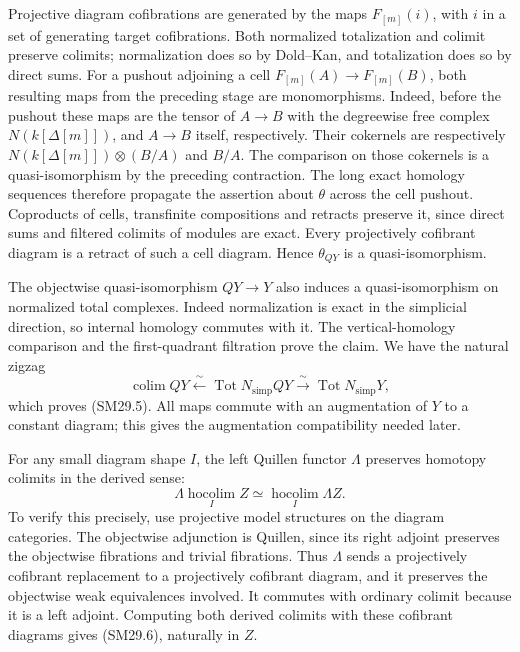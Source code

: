 Projective diagram cofibrations are generated by the maps
\(F_{[m]}(i)\), with \(i\) in a set of generating target
cofibrations.  Both normalized totalization and colimit
preserve colimits; normalization does so by Dold--Kan,
and totalization does so by direct sums.
For a pushout adjoining a cell \(F_{[m]}(A)\to F_{[m]}(B)\),
both resulting maps from the preceding stage are monomorphisms.
Indeed, before the pushout these maps are the tensor of \(A\to B\)
with the degreewise free complex \(N(k[\Delta[m]])\), and
\(A\to B\) itself, respectively.
Their cokernels are respectively
\(N(k[\Delta[m]])\otimes(B/A)\) and \(B/A\).
The comparison on those cokernels is a quasi-isomorphism by
the preceding contraction.  The long exact homology sequences
therefore propagate the assertion about \(\theta\) across the
cell pushout.  Coproducts of cells, transfinite compositions
and retracts preserve it, since direct sums and filtered
colimits of modules are exact.  Every projectively cofibrant
diagram is a retract of such a cell diagram.  Hence
\(\theta_{QY}\) is a quasi-isomorphism.

The objectwise quasi-isomorphism \(QY\to Y\) also induces a
quasi-isomorphism on normalized total complexes.
Indeed normalization is exact in the simplicial direction,
so internal homology commutes with it.  The vertical-homology
comparison and the first-quadrant filtration prove the claim.
We have the natural zigzag
\[
 \operatorname{colim}QY
 \xleftarrow{\ \sim\ }\operatorname{Tot}N_{\mathrm{simp}}QY
 \xrightarrow{\ \sim\ }\operatorname{Tot}N_{\mathrm{simp}}Y,
\]
which proves (SM29.5).  All maps commute with an augmentation
of \(Y\) to a constant diagram; this gives the augmentation
compatibility needed later.

For any small diagram shape \(I\), the left Quillen functor
\(\Lambda\) preserves homotopy colimits in the derived sense:
\[
 \Lambda\operatorname*{hocolim}_I Z
       \simeq\operatorname*{hocolim}_I\Lambda Z.
 \tag{SM29.6}
\]
To verify this precisely, use projective model structures on
the diagram categories.  The objectwise adjunction is
Quillen, since its right adjoint preserves the objectwise
fibrations and trivial fibrations.  Thus \(\Lambda\) sends a
projectively cofibrant replacement to a projectively
cofibrant diagram, and it preserves the objectwise weak
equivalences involved.  It commutes with ordinary colimit
because it is a left adjoint.  Computing both derived
colimits with these cofibrant diagrams gives (SM29.6),
naturally in \(Z\).

